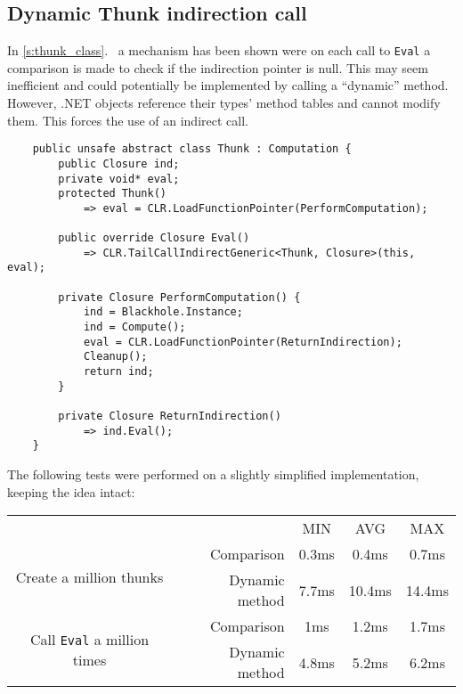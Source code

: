\documentclass[en]{pracamgr}
\newcommand{\myref}[1]{\ref{#1}.~\textit{\nameref{#1}}}
\begin{document}
\subsection{Dynamic Thunk indirection call}\label{perf:thunk_ind}

In \myref{s:thunk_class} a mechanism has been shown were
on each call to \texttt{Eval} a comparison is made to
check if the indirection pointer is null.
This may seem inefficient and could potentially be implemented
by calling a ``dynamic'' method.
However, .NET objects reference their types' method tables
and cannot modify them. This forces the use of an indirect call.

\begin{verbatim}
    public unsafe abstract class Thunk : Computation {
        public Closure ind;
        private void* eval;
        protected Thunk()
            => eval = CLR.LoadFunctionPointer(PerformComputation);
        
        public override Closure Eval()
            => CLR.TailCallIndirectGeneric<Thunk, Closure>(this, eval);
        
        private Closure PerformComputation() {
            ind = Blackhole.Instance;
            ind = Compute();
            eval = CLR.LoadFunctionPointer(ReturnIndirection);
            Cleanup();
            return ind;
        }

        private Closure ReturnIndirection()
            => ind.Eval();
    }
\end{verbatim}

The following tests were performed on a slightly simplified
implementation, keeping the idea intact:

\begin{center}
\begin{tabular}{c r c c c}
    & & MIN & AVG & MAX \\
    \cline{3-5}

    \multirow{2}{*}{Create a million thunks}
    & Comparison & 0.3ms & 0.4ms & 0.7ms \\
    & Dynamic method & 7.7ms & 10.4ms & 14.4ms \\
    \cline{2-5}

    \multirow{2}{*}{Call \texttt{Eval} a million times} 
    & Comparison & 1ms & 1.2ms & 1.7ms \\
    & Dynamic method & 4.8ms & 5.2ms & 6.2ms \\
    
\end{tabular}
\end{center}
\end{document}
